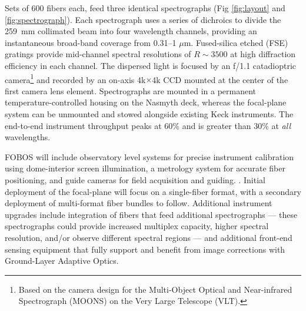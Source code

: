 Sets of 600 fibers each, feed three identical spectrographs (Fig
\ref{fig:layout} and \ref{fig:spectrograph}). Each spectrograph uses
a series of dichroics to divide the 259~mm collimated beam into four
wavelength channels, providing an instantaneous broad-band coverage
from 0.31--1 $\mu$m. Fused-silica etched (FSE) gratings provide
mid-channel spectral resolutions of $R\sim3500$ at high diffraction
efficiency in each channel. The dispersed light is focused by an
f/1.1 catadioptric camera\footnote{Based on the camera design for the
Multi-Object Optical and Near-infrared Spectrograph (MOONS) on the
Very Large Telescope (VLT).} and recorded by an on-axis 4k$\times$4k
CCD mounted at the center of the first camera lens element.
Spectrographs are mounted in a permanent temperature-controlled
housing on the Nasmyth deck, whereas the focal-plane system can be
unmounted and stowed alongside existing Keck instruments. The
end-to-end instrument throughput peaks at 60\% and is greater than
30\% at {\it all} wavelengths.

FOBOS will include observatory level systems for precise instrument
calibration using dome-interior screen illumination, a metrology system
for accurate fiber positioning, and guide cameras for field acquisition
and guiding. . Initial deployment of the focal-plane will focus on a
single-fiber format, with a secondary deployment of multi-format fiber
bundles to follow. Additional instrument upgrades include integration of
fibers that feed additional spectrographs --- these spectrographs could
provide increased multiplex capacity, higher spectral resolution, and/or
observe different spectral regions --- and additional front-end sensing
equipment that fully support and benefit from image corrections with
Ground-Layer Adaptive Optics.

